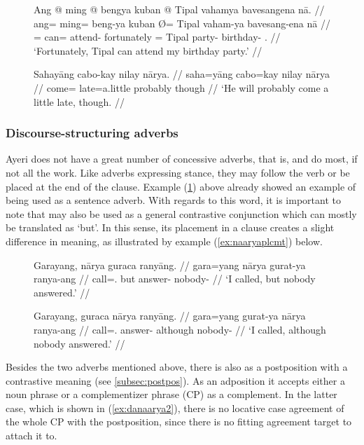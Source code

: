\begin{figure}[h]
\pex\label{ex:stanceadv}
\a\begingl
	\gla Ang @ ming @ bengya kuban {} @ Tipal vahamya bavesangena nā. //
	\glb ang= ming= beng-ya kuban Ø= Tipal vaham-ya bavesang-ena nā //
	\glc \AgtT{}= can= attend-\TsgM{} fortunately \Top{}= Tipal party-\Loc{} 
		birthday-\Gen{} \Fsg{}.\Gen{} //
	\glft `Fortunately, Tipal can attend my birthday party.' //
\endgl

\a\label{ex:naaryaadv}\begingl
	\gla Sahayāng cabo-kay nilay nārya. //
	\glb saha=yāng cabo=kay nilay nārya //
	\glc come=\TsgM{} late=a.little probably though //
	\glft `He will probably come a little late, though. //
\endgl
\xe
\end{figure}

\subsubsection{Discourse-structuring adverbs}
\label{subsubsec:discourseadv}

Ayeri does not have a great number of concessive adverbs, that is,
 and  do most, if not all the work. Like adverbs expressing stance,
they may follow the verb or be placed at the end of the clause. Example
(\ref{ex:naaryaadv}) above already showed an example of 
being used as a sentence adverb. With regards to this word, it is important to
note that  may also be used as a general contrastive
conjunction which can mostly be translated as `but'. In this sense, its
placement in a clause creates a slight difference in meaning, as illustrated
by example (\ref{ex:naaryaplcmt}) below.

\begin{figure}[h]
\pex\label{ex:naaryaplcmt}
\a\label{ex:naaryaconj}\begingl
	\gla Garayang, nārya guraca ranyāng. //
	\glb gara=yang nārya gurat-ya ranya-ang //
	\glc call=\Fsg{}.\Aarg{} but answer-\TsgM{} nobody-\Aarg{} //
	\glft `I called, but nobody answered.' //
\endgl

\a\label{ex:naaryaadv2}\begingl
	\gla Garayang, guraca nārya ranyāng. //
	\glb gara=yang gurat-ya nārya ranya-ang //
	\glc call=\Fsg{}.\Aarg{} answer-\TsgM{} although nobody-\Aarg{} //
	\glft `I called, although nobody answered.' //
\endgl
\xe
\end{figure}

Besides the two adverbs mentioned above, there is also
 as a postposition
with a contrastive meaning (see \autoref{subsec:postpos}). As an adposition it
accepts either a noun phrase or a complementizer phrase (CP) as a complement.
In the latter case, which is shown in (\ref{ex:danaarya2}), there is no
locative case agreement of the whole CP with the postposition, since there is
no fitting agreement target to attach it to.

